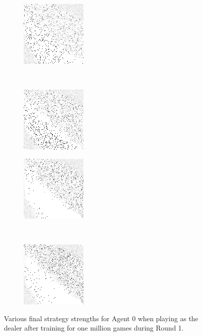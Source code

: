\begin{figure}
	\begin{subfigure}[b]{0.4\textwidth}
		\includegraphics[height=0.23\textheight]{images/findings/round1/strategies_cribminavg.png}
		\caption{\cribminavg}
	\end{subfigure}
	~
	\begin{subfigure}[b]{0.4\textwidth}
		\includegraphics[height=0.23\textheight]{images/findings/round1/strategies_peggingmaxavggained.png}
		\caption{\peggingmaxavggained}
	\end{subfigure}

	\begin{subfigure}[b]{0.4\textwidth}
		\includegraphics[height=0.23\textheight]{images/findings/round1/strategies_peggingmaxmedgained.png}
		\caption{\peggingmaxmedgained}
	\end{subfigure}
	~
	\begin{subfigure}[b]{0.4\textwidth}
		\includegraphics[height=0.23\textheight]{images/findings/round1/strategies_peggingminavggiven.png}
		\caption{\peggingminavggiven}
	\end{subfigure}

\caption{
	Various final strategy strengths for Agent 0
	when playing as the dealer
	after training for one million games during Round 1.
}
\label{fig_r1-strats}
\end{figure}
